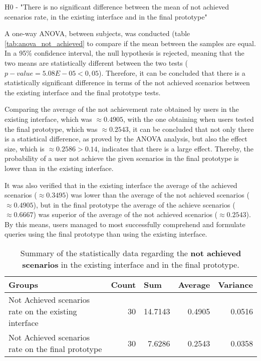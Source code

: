 \begin{center}
  H0 - "There is no significant difference between the mean of not achieved scenarios rate, in the existing interface and in the final prototype"
\end{center}

A one-way ANOVA, between subjects, was conducted (table \ref{tab:anova_not_achieved} to compare if the mean between the samples are equal. In a 95\% confidence interval, the null hypothesis is rejected, meaning that the two means are statistically different between the two tests ($p-value = 5.08E-05 < 0,05$). Therefore, it can be concluded that there is a statistically significant difference in terms of the not achieved scenarios between the existing interface and the final prototype tests.

Comparing the average of the not achievement rate obtained by users in the existing interface, which was $\approx 0.4905$, with the one obtaining when users tested the final prototype, which was $\approx 0.2543$, it can be concluded that not only there is a statistical difference, as proved by the ANOVA analysis, but also the effect size, which is $\approx 0.2586 > 0.14$, indicates that there is a large effect. Thereby, the probability of a user not achieve the given scenarios in the final prototype is lower than in the existing interface. 

It was also verified that in the existing interface the average of the achieved scenarios ($\approx 0.3495$) was lower than the average of the not achieved scenarios ($\approx 0.4905$), but in the final prototype the average of the achieve scenarios ($\approx 0.6667$) was superior of the average of the not achieved scenarios ($\approx 0.2543$). By this means, users managed to most successfully comprehend and formulate queries using the final prototype than using the existing interface.



\begin{table}[tb]
  \caption{Summary of the statistically data regarding the \textbf{not achieved scenarios} in the existing interface and in the final prototype.}
	\label{tab:statistical_summary_not_achieved}
  \begin{tabular}{@{}m{5cm}rrrr@{}}
  \toprule
  \textbf{Groups}                                       & \multicolumn{1}{l}{\textbf{Count}} & \multicolumn{1}{l}{\textbf{Sum}} & \multicolumn{1}{l}{\textbf{Average}} & \multicolumn{1}{l}{\textbf{Variance}} \\ \midrule
  Not Achieved scenarios rate on the existing interface & 30                                 & 14.7143                          & 0.4905                               & 0.0516                                \\
  Not Achieved scenarios rate on the final prototype    & 30                                 & 7.6286                           & 0.2543                               & 0.0358                                \\ \bottomrule
  \end{tabular}
  \end{table}


